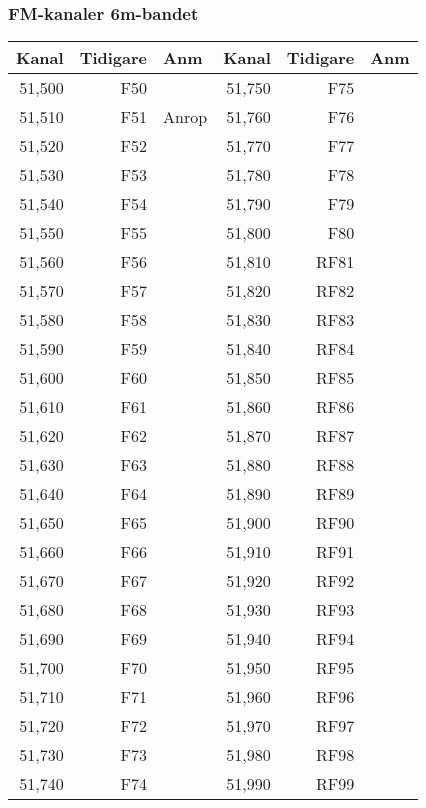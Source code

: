 \subsubsection{FM-kanaler 6m-bandet}

\begin{longtable}{rrl|rrl}
\textbf{Kanal} & \textbf{Tidigare} & \textbf{Anm}
&  \textbf{Kanal} & \textbf{Tidigare} & \textbf{Anm} \\ \hline
	51,500 &      F50 &       & 51,750 &      F75 &  \\
	51,510 &      F51 & Anrop & 51,760 &      F76 &  \\
	51,520 &      F52 &       & 51,770 &      F77 &  \\
	51,530 &      F53 &       & 51,780 &      F78 &  \\
	51,540 &      F54 &       & 51,790 &      F79 &  \\
	51,550 &      F55 &       & 51,800 &      F80 &  \\
	51,560 &      F56 &       & 51,810 &     RF81 &  \\
	51,570 &      F57 &       & 51,820 &     RF82 &  \\
	51,580 &      F58 &       & 51,830 &     RF83 &  \\
	51,590 &      F59 &       & 51,840 &     RF84 &  \\
	51,600 &      F60 &       & 51,850 &     RF85 &  \\
	51,610 &      F61 &       & 51,860 &     RF86 &  \\
	51,620 &      F62 &       & 51,870 &     RF87 &  \\
	51,630 &      F63 &       & 51,880 &     RF88 &  \\
	51,640 &      F64 &       & 51,890 &     RF89 &  \\
	51,650 &      F65 &       & 51,900 &     RF90 &  \\
	51,660 &      F66 &       & 51,910 &     RF91 &  \\
	51,670 &      F67 &       & 51,920 &     RF92 &  \\
	51,680 &      F68 &       & 51,930 &     RF93 &  \\
	51,690 &      F69 &       & 51,940 &     RF94 &  \\
	51,700 &      F70 &       & 51,950 &     RF95 &  \\
	51,710 &      F71 &       & 51,960 &     RF96 &  \\
	51,720 &      F72 &       & 51,970 &     RF97 &  \\
	51,730 &      F73 &       & 51,980 &     RF98 &  \\
	51,740 &      F74 &       & 51,990 &     RF99 &
\end{longtable}

